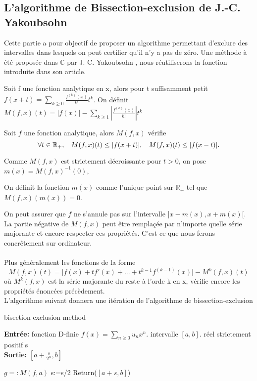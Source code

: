 \documentclass[a4paper,10.5pt]{article}
\begin{document}
	\subsection{L'algorithme de Bissection-exclusion de J.-C. Yakoubsohn}
	
	Cette partie a pour objectif de proposer un algorithme permettant d'exclure des intervalles dans lesquels on peut certifier qu'il n'y a pas de zéro. Une méthode à été proposée dans $\mathbb{C}$ par J.-C. Yakoubsohn \cite{DBLP:journals/jc/Yakoubsohn05}, nous réutiliserons la fonction introduite dans son article.
	
	\begin{definition}Soit f une fonction analytique en x, alors pour t suffisamment petit\\ $f(x+t)=\sum_{k\geq0} \frac{f^{(k)}(x)}{k!}t^{k}$. On définit $M(f,x)(t)=|f(x)|-\sum_{k\geq1}|\frac{f^{(k)}(x)}{k!}|t^{k}$
	\end{definition}
	\begin{proposition}
		Soit $f$ une fonction analytique, alors $M(f,x)$ vérifie 
		\[\forall t \in \mathbb{R}_+, \hspace{3mm} M(f,x)(t) \leq |f(x+t)|, \hspace{3mm} M(f,x)(t) \leq |f(x-t)|.\]
	\end{proposition}
	 Comme $M(f,x)$ est strictement décroissante pour $t>0$, on pose $m(x)=M(f,x)^{-1}(0)$, 
	\begin{definition}
		On définit la fonction $m(x)$ comme l'unique point sur $\mathbb{R}_+$ tel que $M(f,x)(m(x))=0$.
	\end{definition} 
	On peut assurer que $f$ ne s'annule pas sur l'intervalle $]x-m(x),x+m(x)[$.
	La partie négative de $M(f,x)$ peut être remplaçée par n'importe quelle série majorante et encore respecter ces propriétés. C'est ce que nous ferons concrêtement sur ordinateur.\\
	\\
	Plus généralement les fonctions de la forme \[M(f,x)(t)=\big|f(x)+tf'(x)+...+t^{k-1}f^{(k-1)}(x)\big|-M^{k}(f,x)(t)\] où $M^{k}(f,x)$ est la série  majorante du reste à l'orde k en x, vérifie encore les propriétés énoncées précèdement.\\
	
	\noindent L'algorithme suivant donnera une itération de l'algorithme de bissection-exclusion 
	
	
	\begin{algorithm}
		\caption{bisection-exclusion method}
		
		\vspace{2mm}
		
		\textbf{Entrée:} fonction D-finie $f(x)=\sum_{n \geq 0} u_nx^{n}$. intervalle $[a,b]$. réel strictement positif s\\
		\textbf{Sortie:} $[a+\frac{s}{2^n},b]$
		
		\begin{algorithmic}[1]
			\STATE $g=:M(f,a)$
			\STATE s:=s/2
			\ENDWHILE
			\STATE Return($[a+s,b]$)
		\end{algorithmic}
		
	\end{algorithm}
	
\end{document}
